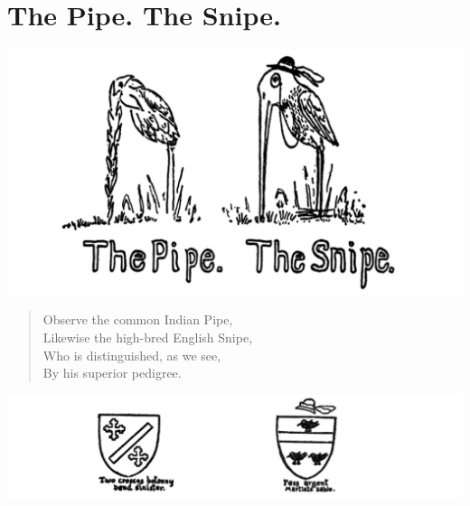 \documentclass[letterpaper, 10pt, openany]{memoir}
\begin{document}
\chapter{The Pipe. The Snipe.}
\includegraphics[width=1\textwidth]{f-p24a.png}
\vspace{\onelineskip}
\begin{verse}\huge
Observe the common Indian Pipe,\\
Likewise the high-bred English Snipe,\\
Who is distinguished, as we see,\\
By his superior pedigree.
\end{verse}
\vspace{\onelineskip}
\includegraphics[width=1\textwidth]{f-p24b.png}
\end{document}
